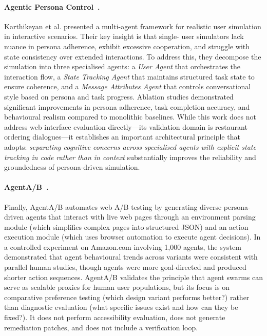 \paragraph{Agentic Persona Control~\cite{agenticpersona}.}
Karthikeyan et al. presented a multi-agent framework for realistic user simulation in interactive scenarios. Their key insight is that single- user simulators lack nuance in persona adherence, exhibit excessive cooperation, and struggle with state consistency over extended interactions. To address this, they decompose the simulation into three specialised agents: a \textit{User Agent} that orchestrates the interaction flow, a \textit{State Tracking Agent} that maintains structured task state to ensure coherence, and a \textit{Message Attributes Agent} that controls conversational style based on persona and task progress. Ablation studies demonstrated significant improvements in persona adherence, task completion accuracy, and behavioural realism compared to monolithic baselines. While this work does not address web interface evaluation directly---its validation domain is restaurant ordering dialogues---it establishes an important architectural principle that \versimux{} adopts: \textit{separating cognitive concerns across specialised agents with explicit state tracking in code rather than in  context} substantially improves the reliability and groundedness of persona-driven simulation.

\paragraph{AgentA/B~\cite{agentab}.}
Finally, AgentA/B automates web A/B testing by generating diverse persona-driven  agents that interact with live web pages through an environment parsing module (which simplifies complex pages into structured JSON) and an action execution module (which uses browser automation to execute agent decisions). In a controlled experiment on Amazon.com involving 1,000 agents, the system demonstrated that agent behavioural trends across  variants were consistent with parallel human studies, though agents were more goal-directed and produced shorter action sequences. AgentA/B validates the principle that  agent swarms can serve as scalable proxies for human user populations, but its focus is on comparative preference testing (which design variant performs better?) rather than diagnostic evaluation (what specific issues exist and how can they be fixed?). It does not perform accessibility evaluation, does not generate remediation patches, and does not include a verification loop.

